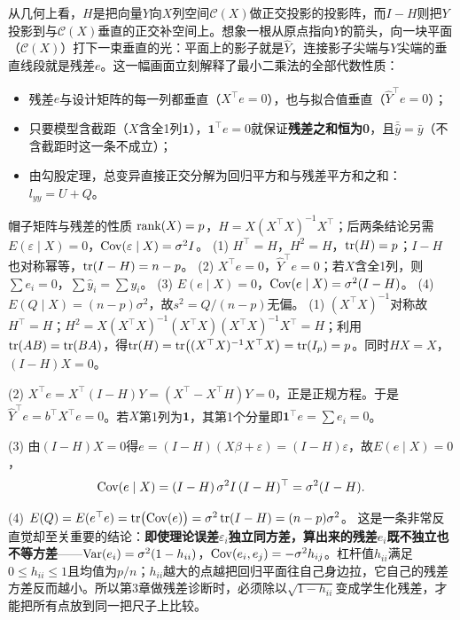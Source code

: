 从几何上看，$H$是把向量$Y$向$X$列空间$\mathcal C(X)$做正交投影的投影阵，而$I-H$则把$Y$投影到与$\mathcal C(X)$垂直的正交补空间上。想象一根从原点指向$Y$的箭头，向一块平面（$\mathcal C(X)$）打下一束垂直的光：平面上的影子就是$\widehat Y$，连接影子尖端与$Y$尖端的垂直线段就是残差$e$。这一幅画面立刻解释了最小二乘法的全部代数性质：
\begin{itemize}
\item 残差$e$与设计矩阵的每一列都垂直（$X^\top e=0$），也与拟合值垂直（$\widehat Y^\top e=0$）；
\item 只要模型含截距（$X$含全1列$\mathbf 1$），$\mathbf 1^\top e=0$就保证\textbf{残差之和恒为0}，且$\bar{\widehat y}=\bar y$（不含截距时这一条不成立）；
\item 由勾股定理，总变异直接正交分解为回归平方和与残差平方和之和：$l_{yy}=U+Q$。
\end{itemize}
\begin{derivation}{帽子矩阵与残差的性质}
$\operatorname{rank}(X)=p$，$H=X(X^\top X)^{-1}X^\top$；后两条结论另需$E(\varepsilon\mid X)=0$，$\operatorname{Cov}(\varepsilon\mid X)=\sigma^2I$。
(1) $H^\top=H$，$H^2=H$，$\operatorname{tr}(H)=p$；$I-H$也对称幂等，$\operatorname{tr}(I-H)=n-p$。
(2) $X^\top e=0$，$\widehat Y^\top e=0$；若$X$含全1列，则$\sum e_i=0$，$\sum\widehat y_i=\sum y_i$。
(3) $E(e\mid X)=0$，$\operatorname{Cov}(e\mid X)=\sigma^2(I-H)$。
(4) $E(Q\mid X)=(n-p)\sigma^2$，故$s^2=Q/(n-p)$无偏。
(1) $(X^\top X)^{-1}$对称故$H^\top=H$；$H^2=X(X^\top X)^{-1}(X^\top X)(X^\top X)^{-1}X^\top=H$；利用$\operatorname{tr}(AB)=\operatorname{tr}(BA)$，得$\operatorname{tr}(H)=\operatorname{tr}\bigl((X^\top X)^{-1}X^\top X\bigr)=\operatorname{tr}(I_p)=p$。同时$HX=X$，$(I-H)X=0$。

(2) $X^\top e=X^\top(I-H)Y=(X^\top-X^\top H)Y=0$，正是正规方程。于是$\widehat Y^\top e=b^\top X^\top e=0$。若$X$第1列为$\mathbf 1$，其第1个分量即$\mathbf 1^\top e=\sum e_i=0$。

(3) 由$(I-H)X=0$得$e=(I-H)(X\beta+\varepsilon)=(I-H)\varepsilon$，故$E(e\mid X)=0$，
\[
\operatorname{Cov}(e\mid X)=(I-H)\,\sigma^2I\,(I-H)^\top=\sigma^2(I-H).
\]

(4) $E(Q)=E(e^\top e)=\operatorname{tr}\bigl(\operatorname{Cov}(e)\bigr)=\sigma^2\operatorname{tr}(I-H)=(n-p)\sigma^2$。
这是一条非常反直觉却至关重要的结论：\textbf{即使理论误差$\varepsilon_i$独立同方差，算出来的残差$e_i$既不独立也不等方差}——$\operatorname{Var}(e_i)=\sigma^2(1-h_{ii})$，$\operatorname{Cov}(e_i,e_j)=-\sigma^2h_{ij}$。杠杆值$h_{ii}$满足$0\le h_{ii}\le 1$且均值为$p/n$；$h_{ii}$越大的点越把回归平面往自己身边拉，它自己的残差方差反而越小。所以第3章做残差诊断时，必须除以$\sqrt{1-h_{ii}}$变成学生化残差，才能把所有点放到同一把尺子上比较。
\end{derivation}

